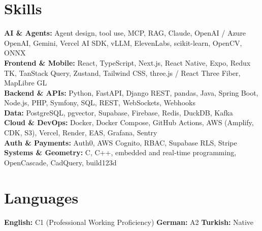 \documentclass[10pt,a4paper]{article}
\begin{document}
\section{Skills}
\textbf{AI \& Agents:} Agent design, tool use, MCP, RAG, Claude, OpenAI / Azure OpenAI, Gemini, Vercel AI SDK, vLLM,
ElevenLabs, scikit-learn, OpenCV, ONNX\\
\textbf{Frontend \& Mobile:} React, TypeScript, Next.js, React Native, Expo, Redux TK, TanStack Query, Zustand,
Tailwind CSS, three.js / React Three Fiber, MapLibre GL\\
\textbf{Backend \& APIs:} Python, FastAPI, Django REST, pandas, Java, Spring Boot, Node.js, PHP, Symfony, SQL, REST,
WebSockets, Webhooks\\
\textbf{Data:} PostgreSQL, pgvector, Supabase, Firebase, Redis, DuckDB, Kafka\\
\textbf{Cloud \& DevOps:} Docker, Docker Compose, GitHub Actions, AWS (Amplify, CDK, S3), Vercel, Render, EAS,
Grafana, Sentry\\
\textbf{Auth \& Payments:} Auth0, AWS Cognito, RBAC, Supabase RLS, Stripe\\
\textbf{Systems \& Geometry:} C, C++, embedded and real-time programming, OpenCascade, CadQuery, build123d

\section{Languages}
\textbf{English:} C1 (Professional Working Proficiency)\quad
\textbf{German:} A2\quad
\textbf{Turkish:} Native
\end{document}
